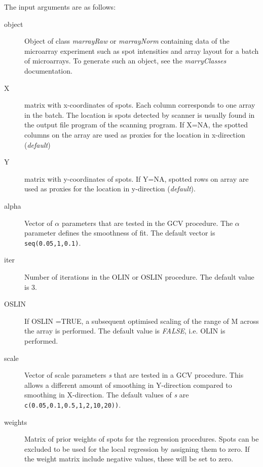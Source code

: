 \documentclass[a4paper,11pt]{article}
\begin{document}
\noindent The input arguments are  as follows:
           \begin{description}
           \item[object] Object of class \emph{marrayRaw} or \emph{marrayNorm} containing 
                         data of the microarray experiment such as spot intensities and array layout
                         for a batch of microarrays.
                         To generate such an object, see the \emph{marryClasses} documentation.
           \item[X]      matrix with x-coordinates of spots. Each column corresponds to one array in the batch. The location is spots detected by scanner
                         is usually 
                         found in the output file program of  the scanning program. 
                          If X=NA, the spotted columns on the  array are used as proxies for the location in x-direction (\emph{default})
           \item[Y] matrix with y-coordinates of spots. If Y=NA, spotted rows on array are used
            as proxies for the location in y-direction (\emph{default}).
           \item[alpha] Vector of $\alpha$  parameters that are tested in the GCV procedure. The $\alpha$  parameter 
                  defines the smoothness of fit.  The default vector is \texttt{seq(0.05,1,0.1)}.
           \item[iter] Number of iterations in the OLIN or OSLIN procedure. The default value is 3. 
           \item[OSLIN] If OSLIN =TRUE, a subsequent optimised scaling of the range of M across the array
                        is performed.
                         The default value is \emph{FALSE}, i.e. OLIN is performed. 
           \item[scale] Vector of scale parameters \emph{s} that are tested in a GCV procedure. 
                    This  allows  a different amount of smoothing in Y-direction compared 
                    to smoothing in X-direction. The default values of \emph{s} are 
                    \texttt{c(0.05,0.1,0.5,1,2,10,20))}.
           \item[weights] Matrix of prior weights of spots for the regression procedures.
                          Spots can be excluded to be used
                          for the local regression by assigning them to zero.  
                          If the weight matrix include negative values, these will be
	                   set to zero.


\end{description}
\end{document}
